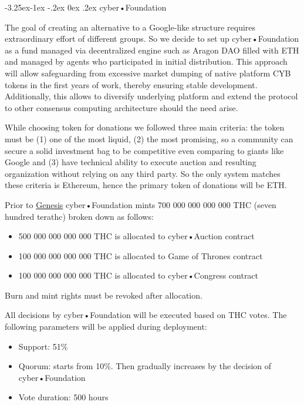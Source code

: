 \documentclass[8pt,oneside]{amsart}
\makeatletter
\renewcommand\subsection{\@startsection{subsection}{2}{\z@}%
                                     {-3.25ex\@plus -1ex \@minus -.2ex}%
                                     {0ex \@plus .2ex}%
                                     {\play\Large}}%
\newcommand{\titleSection}[1]{\subsection{#1}}
\newenvironment{Figure}
  {\par\medskip\noindent\minipage{\linewidth}}
  {\endminipage\par\medskip}
\makeatother
\begin{document}
\titleSection{cyber•Foundation}\label{joint-goal}

The goal of creating an alternative to a Google-like structure requires extraordinary effort of different groups. So we decide to set up cyber•Foundation as a fund managed via decentralized engine such as Aragon DAO filled with ETH and managed by agents who participated in initial distribution. This approach will allow safeguarding from excessive market dumping of native platform CYB tokens in the first years of work, thereby ensuring stable development. Additionally, this allows to diversify underlying platform and extend the protocol to other consensus computing architecture should the need arise.

While choosing token for donations we followed three main criteria: the token must be (1) one of the most liquid, (2) the most promising, so a community can secure a solid investment bag to be competitive even comparing to giants like Google and (3) have technical ability to execute auction and resulting organization without relying on any third party. So the only system matches these criteria is Ethereum, hence the primary token of donations will be ETH. 

Prior to \hyperlink{genesis}{Genesis} cyber•Foundation mints 700 000 000 000 000 THC (seven hundred terathc) broken down as follows:

\begin{itemize}
\item 500 000 000 000 000 THC is allocated to cyber•Auction contract
\item 100 000 000 000 000 THC is allocated to Game of Thrones contract
\item 100 000 000 000 000 THC is allocated to cyber•Congress contract
\end{itemize}

\begin{Figure}
 \centering
 
\end{Figure}

Burn and mint rights must be revoked after allocation.

All decisions by cyber•Foundation will be executed based on THC votes. The following parameters will be applied during deployment:

\begin{itemize}
\item Support: 51\%
\item Quorum: starts from 10\%. Then gradually increases by the decision of cyber•Foundation
\item Vote duration: 500 hours
\end{itemize}
\end{document}
